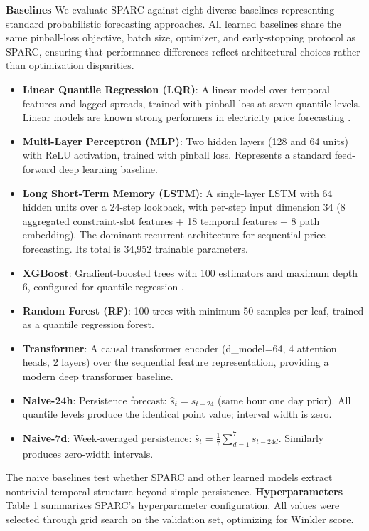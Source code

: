 \textbf{Baselines}
We evaluate SPARC against eight diverse baselines representing standard probabilistic forecasting approaches. All learned baselines share the same pinball-loss objective, batch size, optimizer, and early-stopping protocol as SPARC, ensuring that performance differences reflect architectural choices rather than optimization disparities.
\begin{itemize}
  \item \textbf{Linear Quantile Regression (LQR)}: A linear model over temporal features and lagged spreads, trained with pinball loss at seven quantile levels. Linear models are known strong performers in electricity price forecasting \cite{lago2020forecasting}.
  \item \textbf{Multi-Layer Perceptron (MLP)}: Two hidden layers (128 and 64 units) with ReLU activation, trained with pinball loss. Represents a standard feed-forward deep learning baseline.
  \item \textbf{Long Short-Term Memory (LSTM)}: A single-layer LSTM with 64 hidden units over a 24-step lookback, with per-step input dimension 34 (8 aggregated constraint-slot features + 18 temporal features + 8 path embedding). The dominant recurrent architecture for sequential price forecasting. Its total is 34,952 trainable parameters.
  \item \textbf{XGBoost}: Gradient-boosted trees with 100 estimators and maximum depth 6, configured for quantile regression \cite{li2022probabilistic}.
  \item \textbf{Random Forest (RF)}: 100 trees with minimum 50 samples per leaf, trained as a quantile regression forest.
  \item \textbf{Transformer}: A causal transformer encoder (d_model=64, 4 attention heads, 2 layers) over the sequential feature representation, providing a modern deep transformer baseline.
  \item \textbf{Naive-24h}: Persistence forecast: $\hat{s}_t = s_{t-24}$ (same hour one day prior). All quantile levels produce the identical point value; interval width is zero.
  \item \textbf{Naive-7d}: Week-averaged persistence: $\hat{s}_t = \frac{1}{7} \sum_{d=1}^7 s_{t-24d}$. Similarly produces zero-width intervals.
\end{itemize}
The naive baselines test whether SPARC and other learned models extract nontrivial temporal structure beyond simple persistence.
\textbf{Hyperparameters}
Table 1 summarizes SPARC's hyperparameter configuration. All values were selected through grid search on the validation set, optimizing for Winkler score.
